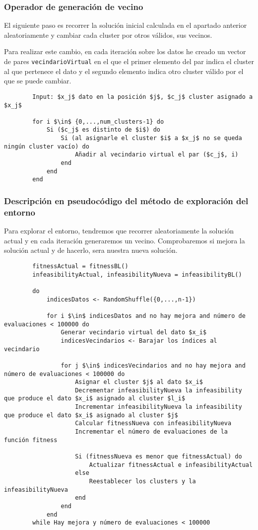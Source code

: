 	\subsubsection{Operador de generación de vecino}
		El siguiente paso es recorrer la solución inicial calculada en el apartado anterior aleatoriamente
		y cambiar cada cluster por otros válidos, sus vecinos.

		Para realizar este cambio, en cada iteración sobre los datos he creado un vector de pares \lstinline!vecindarioVirtual! en el que el primer 
		elemento del par indica el cluster al que pertenece el dato y el segundo elemento indica otro cluster válido por el que se puede cambiar.

		\footnotesize
		\begin{lstlisting}
		Input: $x_j$ dato en la posición $j$, $c_j$ cluster asignado a $x_j$

		for i $\in$ {0,...,num_clusters-1} do 
			Si ($c_j$ es distinto de $i$) do
				Si (al asignarle el cluster $i$ a $x_j$ no se queda ningún cluster vacío) do 
					Añadir al vecindario virtual el par ($c_j$, i)
				end
			end 
		end
		\end{lstlisting}
		\normalsize

	\subsubsection{Descripción en pseudocódigo del método de exploración del entorno}
		Para explorar el entorno, tendremos que recorrer aleatoriamente la solución actual y 
		en cada iteración generaremos un vecino. Comprobaremos si mejora la solución actual y 
		de hacerlo, sera nuestra nueva solución.
		
		\footnotesize
		\begin{lstlisting}
		fitnessActual = fitnessBL()
		infeasibilityActual, infeasibilityNueva = infeasibilityBL()

		do
			indicesDatos <- RandomShuffle({0,...,n-1})

			for i $\in$ indicesDatos and no hay mejora and número de evaluaciones < 100000 do
				Generar vecindario virtual del dato $x_i$
				indicesVecindarios <- Barajar los índices al vecindario

				for j $\in$ indicesVecindarios and no hay mejora and número de evaluaciones < 100000 do 
					Asignar el cluster $j$ al dato $x_i$
					Decrementar infeasibilityNueva la infeasibility que produce el dato $x_i$ asignado al cluster $l_i$
					Incrementar infeasibilityNueva la infeasibility que produce el dato $x_i$ asignado al cluster $j$
					Calcular fitnessNueva con infeasibilityNueva
					Incrementar el número de evaluaciones de la función fitness 

					Si (fitnessNueva es menor que fitnessActual) do 
						Actualizar fitnessActual e infeasibilityActual
					else 
						Reestablecer los clusters y la infeasibilityNueva
					end
				end
			end
		while Hay mejora y número de evaluaciones < 100000
			
	\end{lstlisting}
	\normalsize
		

